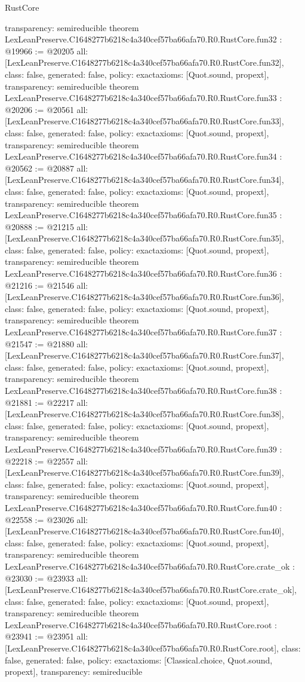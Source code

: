 \begin{lexlean}{RustCore}
\begin{coremodule}
{  transparency: semireducible
}
theorem LexLeanPreserve.C1648277b6218c4a340cef57ba66afa70.R0.RustCore.fun32 : @19966 := @20205 {
  all: [LexLeanPreserve.C1648277b6218c4a340cef57ba66afa70.R0.RustCore.fun32],
  class: false,
  generated: false,
  policy: exact{axioms: [Quot.sound, propext]},
  transparency: semireducible
}
theorem LexLeanPreserve.C1648277b6218c4a340cef57ba66afa70.R0.RustCore.fun33 : @20206 := @20561 {
  all: [LexLeanPreserve.C1648277b6218c4a340cef57ba66afa70.R0.RustCore.fun33],
  class: false,
  generated: false,
  policy: exact{axioms: [Quot.sound, propext]},
  transparency: semireducible
}
theorem LexLeanPreserve.C1648277b6218c4a340cef57ba66afa70.R0.RustCore.fun34 : @20562 := @20887 {
  all: [LexLeanPreserve.C1648277b6218c4a340cef57ba66afa70.R0.RustCore.fun34],
  class: false,
  generated: false,
  policy: exact{axioms: [Quot.sound, propext]},
  transparency: semireducible
}
theorem LexLeanPreserve.C1648277b6218c4a340cef57ba66afa70.R0.RustCore.fun35 : @20888 := @21215 {
  all: [LexLeanPreserve.C1648277b6218c4a340cef57ba66afa70.R0.RustCore.fun35],
  class: false,
  generated: false,
  policy: exact{axioms: [Quot.sound, propext]},
  transparency: semireducible
}
theorem LexLeanPreserve.C1648277b6218c4a340cef57ba66afa70.R0.RustCore.fun36 : @21216 := @21546 {
  all: [LexLeanPreserve.C1648277b6218c4a340cef57ba66afa70.R0.RustCore.fun36],
  class: false,
  generated: false,
  policy: exact{axioms: [Quot.sound, propext]},
  transparency: semireducible
}
theorem LexLeanPreserve.C1648277b6218c4a340cef57ba66afa70.R0.RustCore.fun37 : @21547 := @21880 {
  all: [LexLeanPreserve.C1648277b6218c4a340cef57ba66afa70.R0.RustCore.fun37],
  class: false,
  generated: false,
  policy: exact{axioms: [Quot.sound, propext]},
  transparency: semireducible
}
theorem LexLeanPreserve.C1648277b6218c4a340cef57ba66afa70.R0.RustCore.fun38 : @21881 := @22217 {
  all: [LexLeanPreserve.C1648277b6218c4a340cef57ba66afa70.R0.RustCore.fun38],
  class: false,
  generated: false,
  policy: exact{axioms: [Quot.sound, propext]},
  transparency: semireducible
}
theorem LexLeanPreserve.C1648277b6218c4a340cef57ba66afa70.R0.RustCore.fun39 : @22218 := @22557 {
  all: [LexLeanPreserve.C1648277b6218c4a340cef57ba66afa70.R0.RustCore.fun39],
  class: false,
  generated: false,
  policy: exact{axioms: [Quot.sound, propext]},
  transparency: semireducible
}
theorem LexLeanPreserve.C1648277b6218c4a340cef57ba66afa70.R0.RustCore.fun40 : @22558 := @23026 {
  all: [LexLeanPreserve.C1648277b6218c4a340cef57ba66afa70.R0.RustCore.fun40],
  class: false,
  generated: false,
  policy: exact{axioms: [Quot.sound, propext]},
  transparency: semireducible
}
theorem LexLeanPreserve.C1648277b6218c4a340cef57ba66afa70.R0.RustCore.crate_ok : @23030 := @23933 {
  all: [LexLeanPreserve.C1648277b6218c4a340cef57ba66afa70.R0.RustCore.crate_ok],
  class: false,
  generated: false,
  policy: exact{axioms: [Quot.sound, propext]},
  transparency: semireducible
}
theorem LexLeanPreserve.C1648277b6218c4a340cef57ba66afa70.R0.RustCore.root : @23941 := @23951 {
  all: [LexLeanPreserve.C1648277b6218c4a340cef57ba66afa70.R0.RustCore.root],
  class: false,
  generated: false,
  policy: exact{axioms: [Classical.choice, Quot.sound, propext]},
  transparency: semireducible
}


\end{coremodule}
\end{lexlean}
